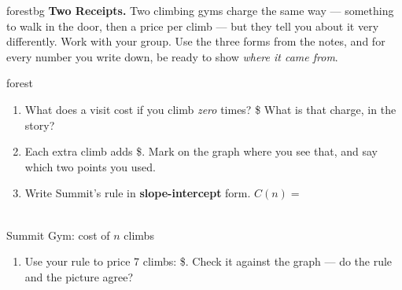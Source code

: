 \documentclass[10pt]{article}
\newcommand{\gymgrid}{%
  \draw[xstep=1, ystep=3, linegray!40, very thin] (0,0) grid (8,30);
  \draw[->, semithick, charcoal] (0,0)--(8.7,0) node[right, font=\scriptsize]{$n$};
  \draw[->, semithick, charcoal] (0,0)--(0,32) node[above, font=\scriptsize]{$C$ (\$)};
  \foreach \x in {2,4,6,8} \node[charcoal, font=\tiny, below] at (\x,0){\x};
  \foreach \y in {6,12,18,24,30} \node[charcoal, font=\tiny, left] at (0,\y){\y};}
\begin{document}

\vspace{0.08in}

\begin{headlinebox}{forestbg}
\small\textbf{Two Receipts.} Two climbing gyms charge the same way --- something to walk in the door,
then a price per climb --- but they tell you about it very differently. Work with your group. Use the
three forms from the notes, and for every number you write down, be ready to show \emph{where it came
from}.
\end{headlinebox}

\vspace{0.06in}

\begin{scenariobox}{forest}
\begin{minipage}[t]{0.56\linewidth}
\vspace{0pt}
\begin{enumerate}[label=\textbf{\alph*.}, leftmargin=1.8em, itemsep=5pt]
  \item What does a visit cost if you climb \emph{zero} times? \$\blank{1.2cm} \;
        What is that charge, in the story? \blank{3.0cm}
  \item Each extra climb adds \$\blank{1.2cm}. Mark on the graph where you see that, and say
        which two points you used.
  \item Write Summit's rule in \textbf{slope-intercept} form. \; $C(n) = $ \blank{3.0cm}
\end{enumerate}
\end{minipage}\hfill
\begin{minipage}[t]{0.40\linewidth}
\vspace{0pt}\centering
{}\\[1pt]
{\footnotesize Summit Gym: cost of $n$ climbs}
\end{minipage}

\begin{enumerate}[label=\textbf{\alph*.}, start=4, leftmargin=1.8em, itemsep=5pt]
  \item Use your rule to price 7 climbs: \$\blank{1.6cm}. Check it against the graph --- do the
        rule and the picture agree? \blank{2.0cm}
\end{enumerate}
\end{scenariobox}
\end{document}
